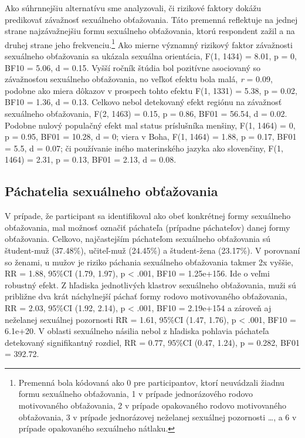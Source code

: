 \documentclass[
]{article}
\begin{document}
Ako súhrnnejšiu alternatívu sme analyzovali, či rizikové faktory dokážu predikovať závažnosť sexuálneho obťažovania. Táto premenná reflektuje na jednej strane najzávažnejšiu formu sexuálneho obťažovania, ktorú respondent zažil a na druhej strane jeho frekvenciu.\footnote{Premenná bola kódovaná ako 0 pre participantov, ktorí neuvádzali žiadnu formu sexuálneho obťažovania, 1 v prípade jednorázového rodovo motivovaného obťažovania, 2 v prípade opakovaného rodovo motivovaného obťažovania, 3 v prípade jednorázovej neželanej sexuálnej pozornosti \ldots, a 6 v prípade opakovaného sexuálneho nátlaku.} Ako mierne významný rizikový faktor závažnosti sexuálneho obťažovania sa ukázala sexuálna orientácia, F(1, 1434) = 8.01, p = 0, BF10 = 5.06, d = 0.15. Vyšší ročník štúdia bol pozitívne asociovaný so závažnosťou sexuálneho obťažovania, no veľkoť efektu bola malá, \emph{r} = 0.09, podobne ako miera dôkazov v prospech tohto efektu F(1, 1331) = 5.38, p = 0.02, BF10 = 1.36, d = 0.13. Celkovo nebol detekovaný efekt regiónu na závažnosť sexuálneho obťažovania, F(2, 1463) = 0.15, p = 0.86, BF01 = 56.54, d = 0.02. Podobne nulový populačný efekt mal status príslušníka menšiny, F(1, 1464) = 0, p = 0.95, BF01 = 10.28, d = 0; viera v Boha, F(1, 1464) = 1.88, p = 0.17, BF01 = 5.5, d = 0.07; či používanie iného materinského jazyka ako slovenčiny, F(1, 1464) = 2.31, p = 0.13, BF01 = 2.13, d = 0.08.

\hypertarget{puxe1chatelia-sexuuxe1lneho-obux165aux17eovania}{%
\subsection{Páchatelia sexuálneho obťažovania}\label{puxe1chatelia-sexuuxe1lneho-obux165aux17eovania}}

V prípade, že participant sa identifikoval ako obeť konkrétnej formy sexuálneho obťažovania, mal možnosť označiť páchateľa (prípadne páchateľov) danej formy obťažovania. Celkovo, najčastejším páchateľom sexuálneho obťažovania sú študent-muž (37.48\%), učiteľ-muž (24.45\%) a študent-žena (23.17\%). V porovnaní so ženami, u mužov je riziko páchania sexuálneho obťažovania takmer 2x vyššie, RR = 1.88, 95\%CI (1.79, 1.97), p \textless{} .001, BF10 = 1.25e+156. Ide o veľmi robustný efekt. Z hľadiska jednotlivých klastrov sexuálneho obťažovania, muži sú približne dva krát náchylnejší páchať formy rodovo motivovaného obťažovania, RR = 2.03, 95\%CI (1.92, 2.14), p \textless{} .001, BF10 = 2.19e+154 a zároveň aj neželanej sexuálnej pozornosti RR = 1.61, 95\%CI (1.47, 1.76), p \textless{} .001, BF10 = 6.1e+20. V oblasti sexuálneho násilia nebol z hľadiska pohlavia páchateľa detekovaný signifikantný rozdiel, RR = 0.77, 95\%CI (0.47, 1.24), p = 0.282, BF01 = 392.72.
\end{document}
